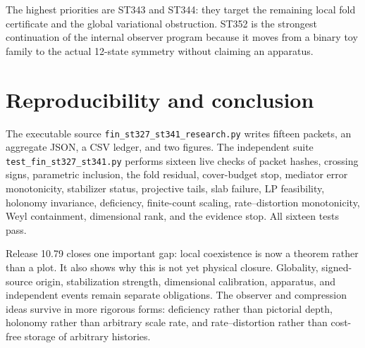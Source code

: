 \documentclass[11pt,a4paper]{article}
\begin{document}
The highest priorities are ST343 and ST344: they target the remaining local fold certificate
and the global variational obstruction. ST352 is the strongest continuation of the internal
observer program because it moves from a binary toy family to the actual 12-state symmetry
without claiming an apparatus.

\section{Reproducibility and conclusion}

The executable source \texttt{fin\_st327\_st341\_research.py} writes fifteen packets, an
aggregate JSON, a CSV ledger, and two figures. The independent suite
\texttt{test\_fin\_st327\_st341.py} performs sixteen live checks of packet hashes, crossing
signs, parametric inclusion, the fold residual, cover-budget stop, mediator error monotonicity,
stabilizer status, projective tails, slab failure, LP feasibility, holonomy invariance,
deficiency, finite-count scaling, rate--distortion monotonicity, Weyl containment,
dimensional rank, and the evidence stop. All sixteen tests pass.

Release 10.79 closes one important gap: local coexistence is now a theorem rather than a
plot. It also shows why this is not yet physical closure. Globality, signed-source origin,
stabilization strength, dimensional calibration, apparatus, and independent events remain
separate obligations. The observer and compression ideas survive in more rigorous forms:
deficiency rather than pictorial depth, holonomy rather than arbitrary scale rate, and
rate--distortion rather than cost-free storage of arbitrary histories.
\end{document}

